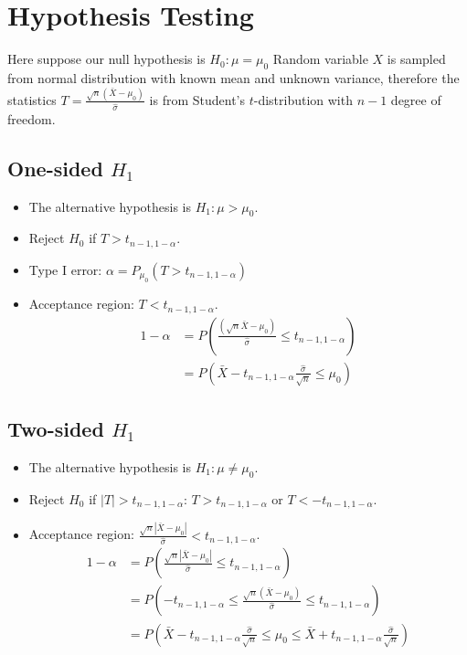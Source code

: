 \section{Hypothesis Testing}
Here suppose our null hypothesis is $H_0: \mu = \mu_0$ Random variable $X$ is sampled from normal distribution with known mean and unknown variance, therefore the statistics $T = \frac{\sqrt{n}(\bar{X} - \mu_0)}{\hat{\sigma}}$ is from Student's $t$-distribution with $n-1$ degree of freedom.
\subsection{One-sided $H_1$}
\begin{itemize}
	\item The alternative hypothesis is $H_1: \mu > \mu_0$. 
	\item Reject $H_0$ if $T > t_{n-1, 1-\alpha}$.
	\item Type I error: $\alpha = P_{\mu_0} (T > t_{n-1, 1-\alpha})$
	\item Acceptance region: $T < t_{n-1, 1-\alpha}$.
	\begin{align*}
		1 - \alpha 
		&= P(\frac{(\sqrt{n}\bar{X} - \mu_0)}{\hat{\sigma}} \le t_{n-1, 1-\alpha})\\
		&= P(\bar{X} - t_{n-1, 1-\alpha} \frac{\hat{\sigma}}{\sqrt{n}} \le \mu_0)
	\end{align*}
\end{itemize}

\subsection{Two-sided $H_1$}
\begin{itemize}
	\item The alternative hypothesis is $H_1: \mu \neq \mu_0$. 
	\item Reject $H_0$ if $|T| > t_{n-1, 1-\alpha}$: $T > t_{n-1, 1-\alpha}$ or $T < - t_{n-1, 1-\alpha}$.

	\item Acceptance region: $ \frac{\sqrt{n}|\bar{X} - \mu_0|}{\hat{\sigma}} < t_{n-1, 1-\alpha}$.
	\begin{align*}
		1 - \alpha 
		&= P(\frac{\sqrt{n}|\bar{X} - \mu_0|}{\hat{\sigma}} \le t_{n-1, 1-\alpha})\\
		&= P(-t_{n-1, 1-\alpha} \le \frac{\sqrt{n}(\bar{X} - \mu_0)}{\hat{\sigma}} \le t_{n-1, 1-\alpha})\\
		&= P(\bar{X}-t_{n-1, 1-\alpha} \frac{\hat{\sigma}}{\sqrt{n}} \le \mu_0 \le \bar{X} + t_{n-1, 1-\alpha} \frac{\hat{\sigma}}{\sqrt{n}})
	\end{align*}
\end{itemize}